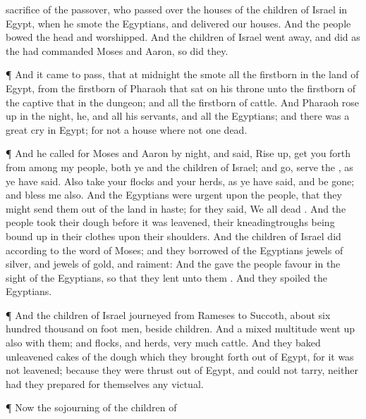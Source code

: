 {sacrifice of the
{}
passover, who
passed over the
houses of the
children of
Israel in
Egypt, when he
smote the
Egyptians, and
delivered our
houses. And the
people bowed the
head and
worshipped.
And the
children of
Israel went
away, and
did as the
{} had
commanded
Moses and
Aaron, so
did they.
\par }{\PP {}¶ And it came to pass, that at
midnight the
{}
smote all the
firstborn in the
land of
Egypt, from the
firstborn of
Pharaoh that
sat on his
throne unto the
firstborn of the
captive that
{} in the
dungeon; and all the
firstborn of
cattle.
And
Pharaoh rose
up in the
night, he, and all his
servants, and all the
Egyptians; and there was a
great
cry in
Egypt; for
{} not a
house where
{} not one
dead.
\par }{\PP {}¶ And he
called for
Moses and
Aaron by
night, and
said, Rise
up,
{} get you
forth from
among my
people, both ye and the
children of
Israel; and
go,
serve the
{}, as ye have
said.
Also
take your
flocks and your
herds, as ye have
said, and be
gone; and
bless me also.
And the
Egyptians were
urgent upon the
people, that they might
send them out of the
land in
haste; for they
said, We
{} all
dead
{}.
And the
people
took their
dough before it was
leavened, their
kneadingtroughs being bound
up in their
clothes upon their
shoulders.
And the
children of
Israel
did according to the
word of
Moses; and they
borrowed of the
Egyptians
jewels of
silver, and
jewels of
gold, and
raiment:
And the
{}
gave the
people
favour in the
sight of the
Egyptians, so that they
lent unto them
{}. And they
spoiled the
Egyptians.
\par }{\PP {}¶ And the
children of
Israel
journeyed from
Rameses to
Succoth, about
six
hundred
thousand on
foot
{}
men,
beside
children.
And a
mixed
multitude went
up also with them; and
flocks, and
herds,
{}
very
much
cattle.
And they
baked
unleavened
cakes of the
dough which they brought
forth out of
Egypt, for it was not
leavened; because they were thrust
out of
Egypt, and
could not
tarry, neither had they
prepared for themselves any
victual.
\par }{\PP {}¶ Now the
sojourning of the
children of
}
